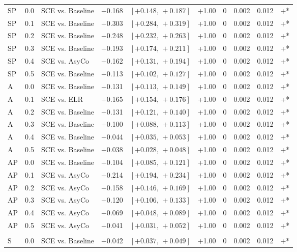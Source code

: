 \begin{landscape}
\begin{scriptsize}
\begin{longtable}{lllrrrrrrl}
SP & 0.0 & SCE vs. Baseline & +0.168 & $[+0.148,\,+0.187]$ & +1.00 & 0 & 0.002 & 0.012 & +* \\
SP & 0.1 & SCE vs. Baseline & +0.303 & $[+0.284,\,+0.319]$ & +1.00 & 0 & 0.002 & 0.012 & +* \\
SP & 0.2 & SCE vs. Baseline & +0.248 & $[+0.232,\,+0.263]$ & +1.00 & 0 & 0.002 & 0.012 & +* \\
SP & 0.3 & SCE vs. Baseline & +0.193 & $[+0.174,\,+0.211]$ & +1.00 & 0 & 0.002 & 0.012 & +* \\
SP & 0.4 & SCE vs. AsyCo & +0.162 & $[+0.131,\,+0.194]$ & +1.00 & 0 & 0.002 & 0.012 & +* \\
SP & 0.5 & SCE vs. Baseline & +0.113 & $[+0.102,\,+0.127]$ & +1.00 & 0 & 0.002 & 0.012 & +* \\
A & 0.0 & SCE vs. Baseline & +0.131 & $[+0.113,\,+0.149]$ & +1.00 & 0 & 0.002 & 0.012 & +* \\
A & 0.1 & SCE vs. ELR & +0.165 & $[+0.154,\,+0.176]$ & +1.00 & 0 & 0.002 & 0.012 & +* \\
A & 0.2 & SCE vs. Baseline & +0.131 & $[+0.121,\,+0.140]$ & +1.00 & 0 & 0.002 & 0.012 & +* \\
A & 0.3 & SCE vs. Baseline & +0.100 & $[+0.088,\,+0.113]$ & +1.00 & 0 & 0.002 & 0.012 & +* \\
A & 0.4 & SCE vs. Baseline & +0.044 & $[+0.035,\,+0.053]$ & +1.00 & 0 & 0.002 & 0.012 & +* \\
A & 0.5 & SCE vs. Baseline & +0.038 & $[+0.028,\,+0.048]$ & +1.00 & 0 & 0.002 & 0.012 & +* \\
AP & 0.0 & SCE vs. Baseline & +0.104 & $[+0.085,\,+0.121]$ & +1.00 & 0 & 0.002 & 0.012 & +* \\
AP & 0.1 & SCE vs. AsyCo & +0.214 & $[+0.194,\,+0.234]$ & +1.00 & 0 & 0.002 & 0.012 & +* \\
AP & 0.2 & SCE vs. AsyCo & +0.158 & $[+0.146,\,+0.169]$ & +1.00 & 0 & 0.002 & 0.012 & +* \\
AP & 0.3 & SCE vs. AsyCo & +0.120 & $[+0.106,\,+0.133]$ & +1.00 & 0 & 0.002 & 0.012 & +* \\
AP & 0.4 & SCE vs. AsyCo & +0.069 & $[+0.048,\,+0.089]$ & +1.00 & 0 & 0.002 & 0.012 & +* \\
AP & 0.5 & SCE vs. AsyCo & +0.041 & $[+0.031,\,+0.052]$ & +1.00 & 0 & 0.002 & 0.012 & +* \\
\addlinespace
\multicolumn{10}{l}{\textit{Macro AUC}} \\
S & 0.0 & SCE vs. Baseline & +0.042 & $[+0.037,\,+0.049]$ & +1.00 & 0 & 0.002 & 0.012 & +* \\

\end{longtable}
\end{scriptsize}
\end{landscape}
